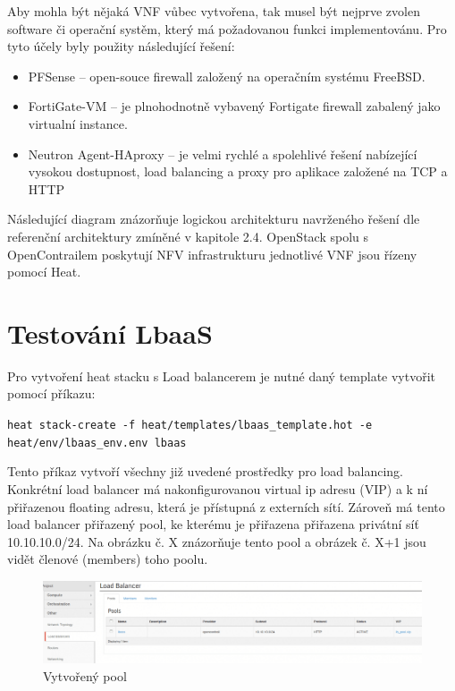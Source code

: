 Aby mohla být nějaká VNF vůbec vytvořena, tak musel být nejprve zvolen software či operační systěm, který má požadovanou funkci implementovánu. Pro tyto účely byly použity následující řešení:

\begin{itemize}
\item PFSense – open-souce firewall založený na operačním systému FreeBSD.
\item FortiGate-VM – je plnohodnotně vybavený Fortigate firewall zabalený jako virtualní instance.
\item Neutron Agent-HAproxy – je velmi rychlé a spolehlivé řešení nabízející vysokou dostupnost, load balancing a proxy pro aplikace založené na TCP a HTTP
\end{itemize}

Následující diagram znázorňuje logickou architekturu navrženého řešení dle referenční architektury zmíněné v kapitole 2.4. OpenStack spolu s OpenContrailem poskytují NFV infrastrukturu jednotlivé VNF jsou řízeny pomocí Heat.


\section{Testování LbaaS}\label{sub:interaction}

Pro vytvoření heat stacku s Load balancerem je nutné daný template vytvořit pomocí příkazu:

\verb!heat stack-create -f heat/templates/lbaas_template.hot -e heat/env/lbaas_env.env lbaas!

Tento příkaz vytvoří všechny již uvedené prostředky pro load balancing. Konkrétní load balancer má nakonfigurovanou virtual ip adresu (VIP) a k ní přiřazenou floating adresu, která je přístupná z externích sítí. Zároveň má tento load balancer přiřazený pool, ke kterému je přiřazena přiřazena privátní síť 10.10.10.0/24. Na obrázku č. X znázorňuje tento pool a obrázek č. X+1 jsou vidět členové (members) toho poolu.

\begin{figure}[h]
\begin{centering}
\includegraphics[scale=0.45]{images/lbaas1}
\par\end{centering}
\caption{Vytvořený pool\label{fig:lbaas1}}
\end{figure}

